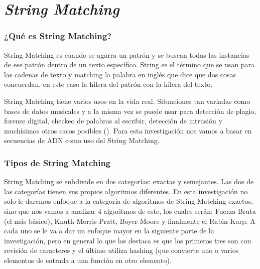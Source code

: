 \part*{\textit{String Matching}}%

\section*{¿Qué es String Matching?}

\quad String Matching es cuando se agarra un patrón y se buscan todas las instancias de ese patrón dentro de un texto específico. String es el término que se usan para las cadenas de texto y matching la palabra en inglés que dice que dos cosas concuerdan, en este caso la hilera del patrón con la hilera del texto.

\quad String Matching tiene varios usos en la vida real. Situaciones tan variadas como bases de datos musicales  y a la misma vez se puede usar para detección de plagio, forense digital, checkeo de palabras al escribir, detección de intrusión y muchísimos otros casos posibles (\cite{GeeksForGeekdsSM}). Para esta investigación nos vamos a basar en secuencias de ADN como uso del String Matching.

\section*{Tipos de String Matching}

\quad String Matching se subdivide en dos categorías: exactas y semejantes. Las dos de las categorías tienen sus propios algoritmos diferentes. En esta investigación no solo le daremos enfoque a la categoría de algoritmos de String Matching exactos, sino que nos vamos a analizar 4 algoritmos de este, los cuales serán: Fuerza Bruta (el más básico), Knuth-Morris-Pratt, Boyer-Moore y finalmente el Rabin-Karp. A cada uno se le va a dar un enfoque mayor en la siguiente parte de la investigación, pero en general lo que los destaca es que los primeros tres son con revisión de caracteres y el último utiliza hashing (que convierte uno o varios elementos de entrada a una función en otro elemento).

